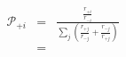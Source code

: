 \begin{eqnarray}
{\mathcal P}_{+i}  & = & \frac{\frac{r_{+i}}{r_{-i}}}{\sum_j\left(\frac{r_{+j}}{r_{-j}} + \frac{r_{-j}}{r_{+j}}  \right)} \\
& = 
\end{eqnarray}